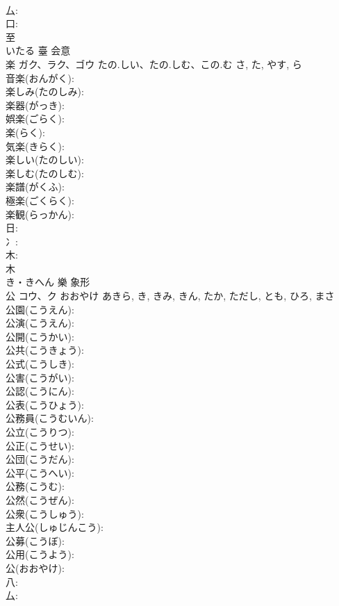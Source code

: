 \documentclass[8pt]{extreport}
\begin{document}
\begin{CJK}{UTF8}{min}
\\	厶: 
\\	口: 
\\	至	
\\	いたる	臺	会意 
\\	楽	ガク、ラク、ゴウ	たの.しい、たの.しむ、この.む	さ, た, やす, ら	
\\	音楽(おんがく): 
\\	楽しみ(たのしみ): 
\\	楽器(がっき): 
\\	娯楽(ごらく): 
\\	楽(らく): 
\\	気楽(きらく): 
\\	楽しい(たのしい): 
\\	楽しむ(たのしむ): 
\\	楽譜(がくふ): 
\\	極楽(ごくらく): 
\\	楽観(らっかん): 
\\	日: 
\\	冫: 
\\	木: 
\\	木	
\\	き・きへん	樂	象形 
\\	公	コウ、ク	おおやけ	あきら, き, きみ, きん, たか, ただし, とも, ひろ, まさ	
\\	公園(こうえん): 
\\	公演(こうえん): 
\\	公開(こうかい): 
\\	公共(こうきょう): 
\\	公式(こうしき): 
\\	公害(こうがい): 
\\	公認(こうにん): 
\\	公表(こうひょう): 
\\	公務員(こうむいん): 
\\	公立(こうりつ): 
\\	公正(こうせい): 
\\	公団(こうだん): 
\\	公平(こうへい): 
\\	公務(こうむ): 
\\	公然(こうぜん): 
\\	公衆(こうしゅう): 
\\	主人公(しゅじんこう): 
\\	公募(こうぼ): 
\\	公用(こうよう): 
\\	公(おおやけ): 
\\	八: 
\\	厶: 

\end{CJK}
\end{document}

